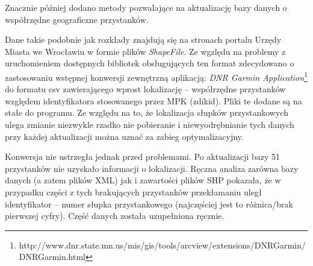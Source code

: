 \documentclass[a4paper,12pt]{article}
\begin{document}
  Znacznie później dodano metody pozwalające na aktualizację bazy danych o
  współrzędne geograficzne przystanków. 
  
  Dane takie podobnie jak rozkłady znajdują się na stronach portalu Urzędy
  Miasta we Wrocławiu w formie plików \emph{ShapeFile}. Ze wgzlędu na problemy
  z uruchomieniem dostępnych bibliotek obsługujących ten format zdecydowano o
  zastosowaniu wstępnej konwersji zewnętrzną aplikacją: \emph{DNR Garmin
  Application}\footnote{http://www.dnr.state.mn.us/mis/gis/tools/arcview/extensions/DNRGarmin/DNRGarmin.html}
  do formatu csv zawierającego wprost lokalizację -- współrzędne przystanków
  względem identyfikatora stosowanego przez MPK (zdikid). Pliki te dodane są na
  stałe do programu. Ze względu na to, że lokalizacja słupków przystankowych
  ulega zmianie niezwykle rzadko nie pobieranie i niewyodrębnianie tych danych
  przy każdej aktualizacji można uznać za zabieg optymalizacyjny. 
  
  Konwersja nie ustrzegła jednak przed problemami. Po aktualizacji bazy 51
  przystanków nie uzyskało informacji o lokalizacji. Ręczna analiza zarówna
  bazy danych (a zatem plików XML) jak i zawartości plików SHP pokazała, że w
  przypadku części z tych brakujących przystanków przekłamaniu uległ
  identyfikator -- numer słupka przystankowego (najczęściej jest to
  różnica/brak pierwszej cyfry). Część danych została uzupełniona ręcznie.
\end{document}
